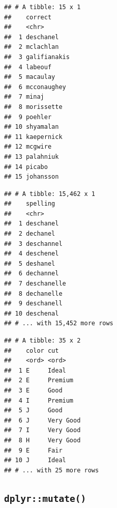 \documentclass[]{book}
\newenvironment{Shaded}{\begin{snugshade}}{\end{snugshade}}
\newcommand{\DataTypeTok}[1]{\textcolor[rgb]{0.13,0.29,0.53}{#1}}
\newcommand{\KeywordTok}[1]{\textcolor[rgb]{0.13,0.29,0.53}{\textbf{#1}}}
\newcommand{\NormalTok}[1]{#1}
\newcommand{\OperatorTok}[1]{\textcolor[rgb]{0.81,0.36,0.00}{\textbf{#1}}}
\newcommand{\StringTok}[1]{\textcolor[rgb]{0.31,0.60,0.02}{#1}}
\begin{document}
\begin{verbatim}
## # A tibble: 15 x 1
##    correct     
##    <chr>       
##  1 deschanel   
##  2 mclachlan   
##  3 galifianakis
##  4 labeouf     
##  5 macaulay    
##  6 mcconaughey 
##  7 minaj       
##  8 morissette  
##  9 poehler     
## 10 shyamalan   
## 11 kaepernick  
## 12 mcgwire     
## 13 palahniuk   
## 14 picabo      
## 15 johansson
\end{verbatim}

\begin{Shaded}
\end{Shaded}

\begin{verbatim}
## # A tibble: 15,462 x 1
##    spelling   
##    <chr>      
##  1 deschanel  
##  2 dechanel   
##  3 deschannel 
##  4 deschenel  
##  5 deshanel   
##  6 dechannel  
##  7 deschanelle
##  8 dechanelle 
##  9 deschanell 
## 10 deschenal  
## # ... with 15,452 more rows
\end{verbatim}

\begin{Shaded}
\end{Shaded}

\begin{verbatim}
## # A tibble: 35 x 2
##    color cut      
##    <ord> <ord>    
##  1 E     Ideal    
##  2 E     Premium  
##  3 E     Good     
##  4 I     Premium  
##  5 J     Good     
##  6 J     Very Good
##  7 I     Very Good
##  8 H     Very Good
##  9 E     Fair     
## 10 J     Ideal    
## # ... with 25 more rows
\end{verbatim}

\hypertarget{dplyrmutate}{%
\subsection{\texorpdfstring{\texttt{dplyr::mutate()}}{dplyr::mutate()}}\label{dplyrmutate}}

\begin{Shaded}
\end{Shaded}
\end{document}
